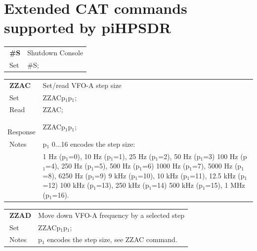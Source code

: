 \documentclass[12pt]{book}
\def\pH{pi\-HPSDR\xspace}
\begin{document}
\section[Extended CAT commands]{Extended CAT commands supported by \pH}

\begin{center}
\begin{tabular}{|p{2cm}|p{11cm}|}
\toprule
$\phantom{\Big|}$\textbf{\large \#S} & Shutdown Console \\\cline{1-2}
$\phantom{\Big|}${\large Set} & {\#S;} \\\hline
\bottomrule
\end{tabular}
\end{center}

\begin{center}
\begin{tabular}{|p{2cm}|p{11cm}|}
\toprule
$\phantom{\Big|}$\textbf{\large ZZAC} & Set/read VFO-A step size \\\cline{1-2}
$\phantom{\Big|}${\large Set} & {ZZACp$_1$p$_1$;} \\\hline
$\phantom{\Big|}${\large Read} & {ZZAC;} \\\hline
$\phantom{\Big|}${\large Response} & {ZZACp$_1$p$_1$;} \\\hline
$\phantom{\Big|}${\large Notes} & \multicolumn{1}{|p{11cm}|}{p$_1$ 0...16 encodes the step size:} \\
 & \multicolumn{1}{|p{11cm}|}{1 Hz (p$_1$=0), 10 Hz (p$_1$=1), 25 Hz (p$_1$=2), 50 Hz (p$_1$=3) 100 Hz (p$_1$=4), 250 Hz (p$_1$=5), 500 Hz (p$_1$=6) 1000 Hz (p$_1$=7), 5000 Hz (p$_1$=8), 6250 Hz (p$_1$=9) 9 kHz (p$_1$=10), 10 kHz (p$_1$=11), 12.5 kHz (p$_1$=12) 100 kHz (p$_1$=13), 250 kHz (p$_1$=14) 500 kHz (p$_1$=15), 1 MHz (p$_1$=16).} \\
\bottomrule
\end{tabular}
\end{center}

\begin{center}
\begin{tabular}{|p{2cm}|p{11cm}|}
\toprule
$\phantom{\Big|}$\textbf{\large ZZAD} & Move down VFO-A frequency by a selected step \\\cline{1-2}
$\phantom{\Big|}${\large Set} & {ZZACp$_1$p$_1$;} \\\hline
$\phantom{\Big|}${\large Notes} & \multicolumn{1}{|p{11cm}|}{p$_1$ encodes the step size, see ZZAC command.} \\
\bottomrule
\end{tabular}
\end{center}
\end{document}
